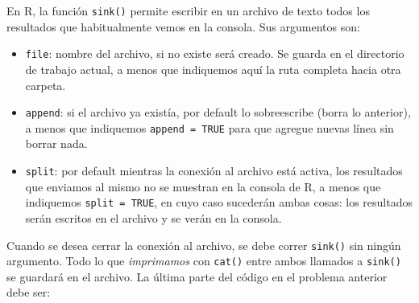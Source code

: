 \documentclass[
]{book}
\providecommand{\tightlist}{%
  \setlength{\itemsep}{0pt}\setlength{\parskip}{0pt}}
\begin{document}
En R, la función \texttt{sink()} permite escribir en un archivo de texto todos los resultados que habitualmente vemos en la consola. Sus argumentos son:

\begin{itemize}
\tightlist
\item
  \texttt{file}: nombre del archivo, si no existe será creado. Se guarda en el directorio de trabajo actual, a menos que indiquemos aquí la ruta completa hacia otra carpeta.
\item
  \texttt{append}: si el archivo ya existía, por default lo sobreescribe (borra lo anterior), a menos que indiquemos \texttt{append\ =\ TRUE} para que agregue nuevas línea sin borrar nada.
\item
  \texttt{split}: por default mientras la conexión al archivo está activa, los resultados que enviamos al mismo no se muestran en la consola de R, a menos que indiquemos \texttt{split\ =\ TRUE}, en cuyo caso sucederán ambas cosas: los resultados serán escritos en el archivo y se verán en la consola.
\end{itemize}

Cuando se desea cerrar la conexión al archivo, se debe correr \texttt{sink()} sin ningún argumento. Todo lo que \emph{imprimamos} con \texttt{cat()} entre ambos llamados a \texttt{sink()} se guardará en el archivo. La última parte del código en el problema anterior debe ser:
\end{document}
